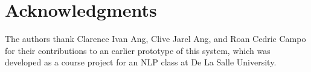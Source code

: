 \section*{Acknowledgments}

The authors thank Clarence Ivan Ang, Clive Jarel Ang, and Roan Cedric Campo for
their contributions to an earlier prototype of this system, which was developed
as a course project for an NLP class at De La Salle University.